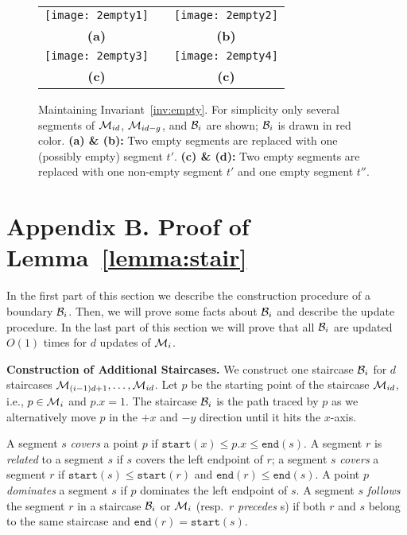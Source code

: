 \documentclass[10pt]{llncs}
\def\idtt#1{\ensuremath{\mathtt{#1}}}
\newcommand{\cM}{{\cal M}}
\newcommand{\cB}{{\cal B}}
\newcommand{\sleft}{\idtt{start}}
\newcommand{\sright}{\idtt{end}}
\begin{document}
\begin{figure}[tbh]
  \centering
  \begin{tabular}{ccc}
  \texttt{[image: 2empty1]} & \hspace*{.7cm} &
  \texttt{[image: 2empty2]} \\
  {\bf (a)}   &  & {\bf(b)}  \\
  \texttt{[image: 2empty3]} & \hspace*{.7cm} &
  \texttt{[image: 2empty4]} \\
  {\bf (c)}   &  & {\bf(c)}  \\
  \end{tabular}
  \caption{{Maintaining Invariant~\ref{inv:empty}. For simplicity only 
      several segments of $\cM_{id}$, $\cM_{id-g}$, and $\cB_i$ are shown; 
      $\cB_i$ is drawn in red color. \bf (a) \& (b):} Two empty segments are
    replaced with one (possibly empty) segment $t'$. 
    {\bf (c) \& (d):}  Two empty segments are replaced with one non-empty
    segment $t'$ and one empty segment $t''$. 
  }
  \label{fig:2empty}
\end{figure}
\newpage

\section*{Appendix B. Proof of Lemma~\ref{lemma:stair}}

In the first part of this section we describe the construction procedure 
of a boundary $\cB_i$. 
Then, we will prove some facts about 
$\cB_i$ and describe the update procedure. In the last part of this section 
we will prove that all $\cB_i$ are
 updated $O(1)$ times for $d$ updates of $\cM_i$. 

{\bf Construction of  Additional  Staircases.}
We construct one staircase $\cB_i$ for $d$ staircases 
$\cM_{(i-1)d+1},\ldots,\cM_{id}$. 
Let $p$ be the starting point of the
 staircase $\cM_{id}$, i.e., $p\in \cM_i$ and $p.x=1$. 
The staircase  $\cB_i$ is the path traced by $p$ as we alternatively
 move $p$ in the $+x$ and $-y$ direction until it hits the $x$-axis.



A segment $s$ \emph{covers} a point $p$ if $\sleft(x) \leq p.x \leq \sright(s)$.
A segment $r$ is \emph{related} to a segment $s$ if $s$ covers the left 
endpoint of $r$; a segment $s$ \emph{covers}  a segment $r$ if
 $\sleft(s)\leq \sleft(r)$
 and $\sright(r)\leq \sright(s)$. A point $p$ \emph{dominates} 
a segment $s$ if $p$ dominates the left endpoint of $s$. A segment $s$ 
\emph{follows} the segment $r$ in a staircase $\cB_i$ or $\cM_i$ 
(resp.\ $r$ \emph{precedes} s) if 
both $r$ and $s$ belong to the same staircase and $\sright(r)=\sleft(s)$.
\end{document}
